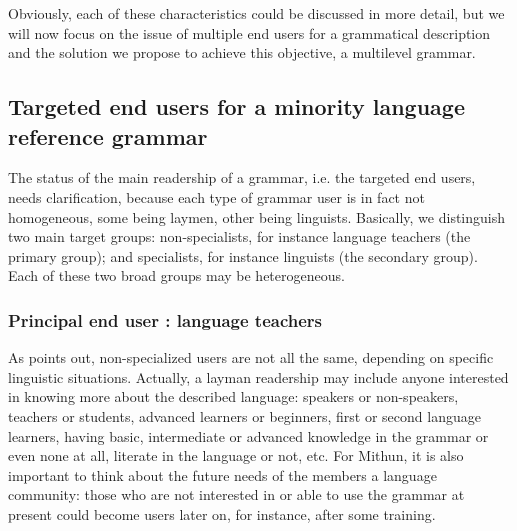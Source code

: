 Obviously, each of these characteristics could be discussed in more detail, but we will now focus on the issue of multiple end users for a grammatical description and the solution we propose to achieve this objective, a multilevel grammar.

\subsection{Targeted end users for a minority language reference grammar} \label{baraby:sec:4.1}
The status of the main readership of a grammar, i.e. the targeted end users, needs clarification, because each type of grammar user is in fact not homogeneous, some being laymen, other being linguists. Basically, we distinguish two main target groups: non-specialists, for instance language teachers (the primary group); and specialists, for instance linguists (the secondary group). Each of these two broad groups may be heterogeneous.

\subsubsection{Principal end user : language teachers} 
As  \citet[282]{Mithun2006} points out, non-specialized users are not all the same, depending on specific linguistic situations. Actually, a layman readership may include anyone interested in knowing more about the described language: speakers or non-speakers, teachers or students, advanced learners or beginners, first or second language learners, having basic, intermediate or advanced knowledge in the grammar or even none at all, literate in the language or not, etc. For Mithun, it is also important to think about the future needs of the members a language community: those who are not interested in or able to use the grammar at present could become users later on, for instance, after some training. 

